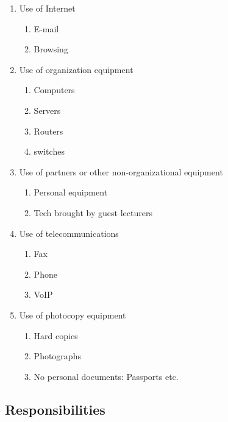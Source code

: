 \begin{enumerate}
  \item Use of Internet
  \begin{enumerate}   
    \item E-mail
    \item Browsing
  \end{enumerate}
  \item Use of organization equipment
  \begin{enumerate}
    \item Computers
    \item Servers
    \item Routers
    \item switches
  \end{enumerate}
  \item Use of partners or other non-organizational equipment
  \begin{enumerate}
    \item Personal equipment
    \item Tech brought by guest lecturers
  \end{enumerate}
  \item Use of telecommunications
  \begin{enumerate}
    \item Fax
    \item Phone
    \item VoIP
  \end{enumerate}
  \item Use of photocopy equipment
  \begin{enumerate}
    \item Hard copies
    \item Photographs 
    \item No personal documents: Passports etc.
  \end{enumerate}
\end{enumerate}

\subsection{Responsibilities}


